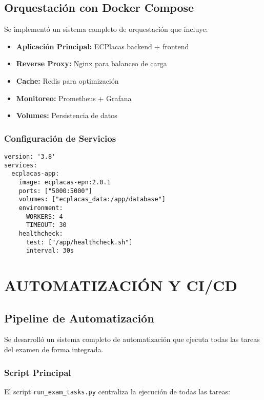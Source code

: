 \documentclass[12pt,a4paper]{article}
\begin{document}
\subsection{Orquestación con Docker Compose}

Se implementó un sistema completo de orquestación que incluye:

\begin{itemize}
    \item \textbf{Aplicación Principal:} ECPlacas backend + frontend
    \item \textbf{Reverse Proxy:} Nginx para balanceo de carga
    \item \textbf{Cache:} Redis para optimización
    \item \textbf{Monitoreo:} Prometheus + Grafana
    \item \textbf{Volumes:} Persistencia de datos
\end{itemize}

\subsubsection{Configuración de Servicios}

\begin{verbatim}
version: '3.8'
services:
  ecplacas-app:
    image: ecplacas-epn:2.0.1
    ports: ["5000:5000"]
    volumes: ["ecplacas_data:/app/database"]
    environment:
      WORKERS: 4
      TIMEOUT: 30
    healthcheck:
      test: ["/app/healthcheck.sh"]
      interval: 30s
\end{verbatim}

\section{AUTOMATIZACIÓN Y CI/CD}

\subsection{Pipeline de Automatización}

Se desarrolló un sistema completo de automatización que ejecuta todas las tareas del examen de forma integrada.

\subsubsection{Script Principal}

El script \texttt{run\_exam\_tasks.py} centraliza la ejecución de todas las tareas:
\end{document}
